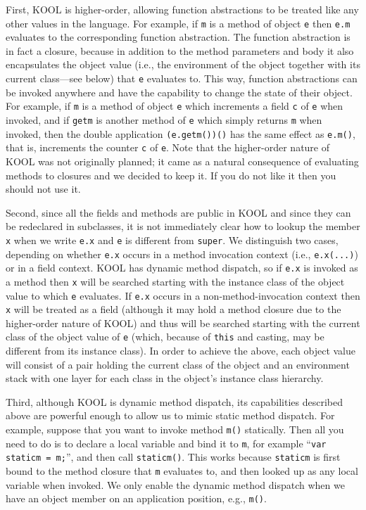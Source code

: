 \begin{latexComment}
First, KOOL is higher-order, allowing function abstractions to be
treated like any other values in the language.  For example, if
\texttt{m} is a method of object \texttt{e} then \texttt{e.m}
evaluates to the corresponding function abstraction.  The function
abstraction is in fact a closure, because in addition to the method
parameters and body it also encapsulates the object value (i.e., the
environment of the object together with its current class---see below)
that \texttt{e} evaluates to.  This way, function abstractions can be
invoked anywhere and have the capability to change the state of their
object.  For example, if \texttt{m} is a method of object \texttt{e}
which increments a field \texttt{c} of \texttt{e} when invoked, and if
\texttt{getm} is another method of \texttt{e} which simply returns
\texttt{m} when invoked, then the double application
\texttt{(e.getm())()} has the same effect as \texttt{e.m()}, that is,
increments the counter \texttt{c} of \texttt{e}.  Note that the
higher-order nature of KOOL was not originally planned; it came as a
natural consequence of evaluating methods to closures and we decided
to keep it.  If you do not like it then you should not use it.

Second, since all the fields and methods are public in KOOL and since
they can be redeclared in subclasses, it is not immediately clear how
to lookup the member \texttt{x} when we write \texttt{e.x} and
\texttt{e} is different from \texttt{super}.  We distinguish two cases,
depending on whether \texttt{e.x} occurs in a method invocation
context (i.e., \texttt{e.x(...)}) or in a field context.  KOOL has
dynamic method dispatch, so if \texttt{e.x} is invoked as a method
then \texttt{x} will be searched starting with the instance class of
the object value to which \texttt{e} evaluates.  If \texttt{e.x}
occurs in a non-method-invocation context then \texttt{x} will be
treated as a field (although it may hold a method closure due to the
higher-order nature of KOOL) and thus will be searched starting with
the current class of the object value of \texttt{e} (which, because of
\texttt{this} and casting, may be different from its instance class).
In order to achieve the above, each object value will consist of a
pair holding the current class of the object and an environment stack
with one layer for each class in the object's instance class hierarchy.

Third, although KOOL is dynamic method dispatch, its capabilities
described above are powerful enough to allow us to mimic static
method dispatch.  For example, suppose that you want to invoke method
\texttt{m()} statically.  Then all you need to do is to declare a
local variable and bind it to \texttt{m}, for example ``\texttt{var
staticm = m;}'', and then call \texttt{staticm()}.  This works because
\texttt{staticm} is first bound to the method closure that \texttt{m}
evaluates to, and then looked up as any local variable when invoked.
We only enable the dynamic method dispatch when we have an object
member on an application position, e.g., \texttt{m()}.


\end{latexComment}
